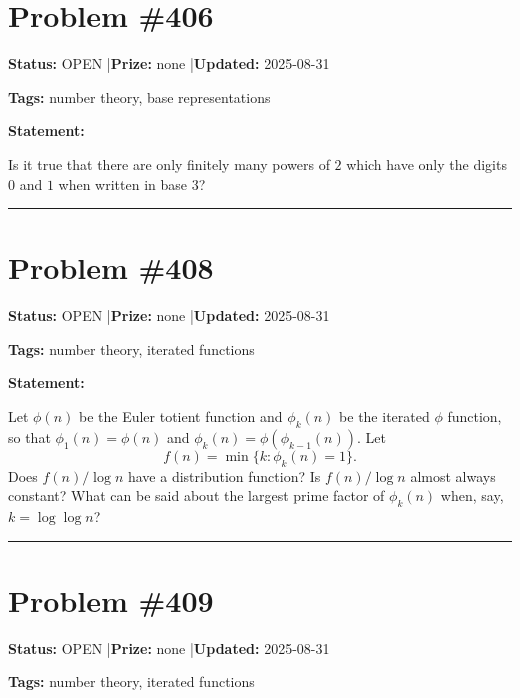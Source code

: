 \documentclass{article}
\begin{document}
\section{Problem \#406}
\label{prob:406}

\noindent\textbf{Status:} OPEN \quad|\quad \textbf{Prize:} none \quad|\quad \textbf{Updated:} 2025-08-31

\noindent\textbf{Tags:} number theory, base representations

\medskip

\noindent\textbf{Statement:}

Is it true that there are only finitely many powers of $2$ which have only the digits $0$ and $1$ when written in base $3$?

\noindent\rule{\linewidth}{0.4pt}


\section{Problem \#408}
\label{prob:408}

\noindent\textbf{Status:} OPEN \quad|\quad \textbf{Prize:} none \quad|\quad \textbf{Updated:} 2025-08-31

\noindent\textbf{Tags:} number theory, iterated functions

\medskip

\noindent\textbf{Statement:}

Let $\phi(n)$ be the Euler totient function and $\phi_k(n)$ be the iterated $\phi$ function, so that $\phi_1(n)=\phi(n)$ and $\phi_k(n)=\phi(\phi_{k-1}(n))$. Let\[f(n) = \min \{ k : \phi_k(n)=1\}.\]Does $f(n)/\log n$ have a distribution function? Is $f(n)/\log n$ almost always constant? What can be said about the largest prime factor of $\phi_k(n)$ when, say, $k=\log\log n$?

\noindent\rule{\linewidth}{0.4pt}


\section{Problem \#409}
\label{prob:409}

\noindent\textbf{Status:} OPEN \quad|\quad \textbf{Prize:} none \quad|\quad \textbf{Updated:} 2025-08-31

\noindent\textbf{Tags:} number theory, iterated functions
\end{document}
